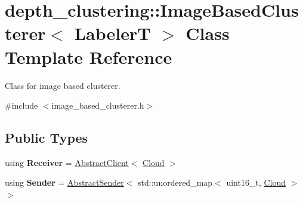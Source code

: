 \hypertarget{classdepth__clustering_1_1ImageBasedClusterer}{}\section{depth\+\_\+clustering\+:\+:Image\+Based\+Clusterer$<$ LabelerT $>$ Class Template Reference}
\label{classdepth__clustering_1_1ImageBasedClusterer}


Class for image based clusterer.  




{\ttfamily \#include $<$image\+\_\+based\+\_\+clusterer.\+h$>$}

\subsection*{Public Types}
\begin{DoxyCompactItemize}
\item 
\mbox{\label{classdepth__clustering_1_1ImageBasedClusterer_a62774a9ad3f50dd9811c2194c99eff7f}} 
using {\bfseries Receiver} = \hyperlink{classdepth__clustering_1_1AbstractClient}{Abstract\+Client}$<$ \hyperlink{classdepth__clustering_1_1Cloud}{Cloud} $>$
\item 
\mbox{\label{classdepth__clustering_1_1ImageBasedClusterer_abafea1c097279afe4f48134d77bac6c6}} 
using {\bfseries Sender} = \hyperlink{classdepth__clustering_1_1AbstractSender}{Abstract\+Sender}$<$ std\+::unordered\+\_\+map$<$ uint16\+\_\+t, \hyperlink{classdepth__clustering_1_1Cloud}{Cloud} $>$ $>$
\end{DoxyCompactItemize}
